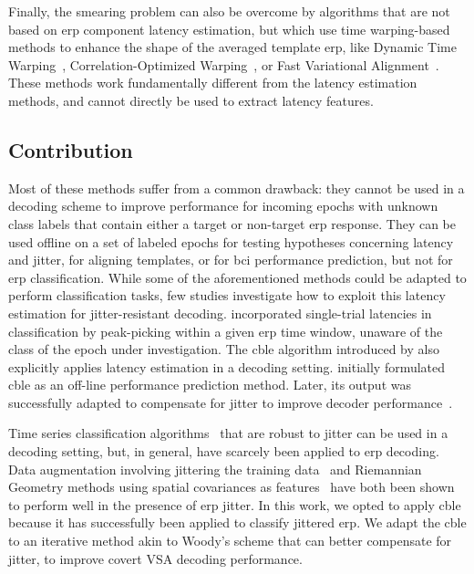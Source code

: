 Finally, the smearing problem can also be overcome by algorithms that are not
based on \ac{erp} component latency estimation, but which use time warping-based methods
to enhance the shape of the averaged template \ac{erp}, like Dynamic Time
Warping~\cite{Gupta1996, Wang2001, Zoumpoulaki2015}, Correlation-Optimized
Warping~\cite{Skov2006}, or Fast Variational
Alignment~\cite{Flotho2021}.
These methods work
fundamentally different from the latency estimation methods, and cannot
directly be used to extract latency features.

\subsection{Contribution}


Most of these methods suffer from a common drawback: they cannot be used in a
decoding scheme to improve performance for incoming epochs with unknown
class labels that contain either a target or non-target \ac{erp} response.
They can be used offline on a set of labeled epochs for testing hypotheses
concerning latency and jitter, for aligning templates, or for \ac{bci} performance
prediction, but not for \ac{erp} classification.
While some of the aforementioned methods could be adapted to perform
classification tasks, few studies investigate how to exploit this latency estimation
for jitter-resistant decoding.
\cite{Hardiansyah2020} incorporated single-trial latencies in
classification by peak-picking within a given
\ac{erp} time window, unaware of the class of the epoch under investigation.
The \ac{cble} algorithm introduced
by \cite{Thompson2012} also explicitly applies latency estimation in a
decoding setting.
\cite{Thompson2012} initially formulated \ac{cble} as an off-line performance
prediction method.
Later, its output was successfully adapted to compensate for jitter to improve
decoder performance~\cite{Mowla2017,Zisk2022}.

Time series classification algorithms~\cite{Abanda2019}
that are robust to jitter can be used in a decoding setting,
but, in general, have scarcely been applied to \ac{erp} decoding.
Data augmentation involving jittering the training
data~\cite{Krell2018,Zisk2022} and Riemannian Geometry methods using spatial
covariances as features~\cite{Aydarkhanov2020} have both been shown
to perform well in the presence of \ac{erp} jitter.
In this work, we opted to apply \ac{cble} because it has successfully been applied to
classify jittered \acs{erp}.
We adapt the \ac{cble} to an iterative method akin to Woody's scheme that can better
compensate for jitter, to improve covert VSA decoding performance.

